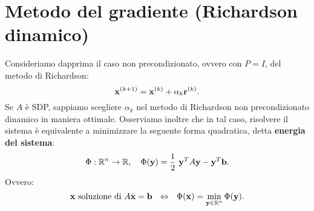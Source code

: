 \section{Metodo del gradiente (Richardson dinamico)}
\label{sez:metodo-del-gradiente}
Consideriamo dapprima il caso non precondizionato, ovvero con $P=I$, del metodo di Richardson:
\begin{equation*}
\mathbf{x}^{( k+1)} =\mathbf{x}^{(k)} +\alpha _{k}\mathbf{r}^{(k)}.
\end{equation*}
Se $A$ è SDP, sappiamo scegliere $\alpha _{k}$ nel metodo di Richardson non precondizionato dinamico in maniera ottimale. %
Osserviamo inoltre che in tal caso, risolvere il sistema è equivalente a minimizzare la seguente forma quadratica, detta \textbf{energia del sistema}:
\begin{equation*}
\Phi :\mathbb{R}^{n}\rightarrow \mathbb{R} ,\quad \Phi (\y) =\frac{1}{2} \ \y^{T} A\y -\y^{T}\mathbf{b}.
\label{eq:energia-sistema-lineare}
\end{equation*}
Ovvero:
\begin{equation*}
\x \ \text{soluzione di} \ A\x =\mathbf{b} \ \ \Leftrightarrow \ \ \Phi (\x) =\min_{\y \in \mathbb{R}^{n}} \Phi (\y) .
\end{equation*}


